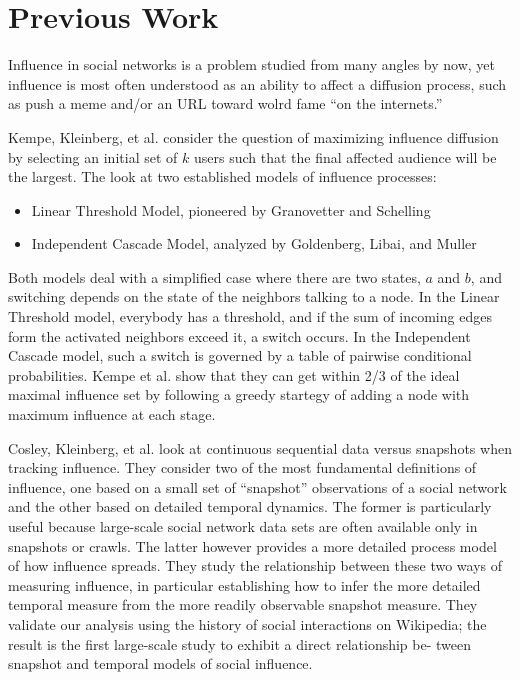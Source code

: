 \documentclass[10pt,oneside]{memoir}
\begin{document}
\pagebreak \chapter{Previous Work}
\label{previouswork}

Influence in social networks is a problem studied from many angles by now, yet influence is most often understood as an ability to affect a diffusion process, such as  push a meme and/or an URL toward wolrd fame ``on the internets.''


Kempe, Kleinberg, et al. \cite{Kempe:2005:Nodes} consider the question of maximizing influence diffusion by selecting an initial set of $k$ users such that the final affected audience will be the largest.  The look at two established models of influence processes:


\begin{itemize}


\item Linear Threshold Model, pioneered by Granovetter and Schelling

\item Independent Cascade Model, analyzed by Goldenberg, Libai, and Muller
\end{itemize}

Both models deal with a simplified case where there are two states, $a$ and $b$, and switching depends on the state of the neighbors talking to a node.  In the Linear Threshold model, everybody has a threshold, and if the sum of incoming edges form the activated neighbors exceed it, a switch occurs.  In the Independent Cascade model, such a switch is governed by a table of pairwise conditional probabilities.  Kempe et al. show that they can get within 2/3 of the ideal maximal influence set by following a greedy startegy of adding a node with maximum influence at each stage. 


Cosley, Kleinberg, et al. look at continuous sequential data versus snapshots when tracking influence.   They consider two of the most fundamental definitions of influence, one based on a small set of ``snapshot'' observations of a social network and the other based on detailed temporal dynamics. The former is particularly useful because large-scale social network data sets are often available only in snapshots or crawls. The latter however provides a more detailed process model of how influence spreads. They study the relationship between these two ways of measuring influence, in particular establishing how to infer the more detailed temporal measure from the more readily observable snapshot measure. They validate our analysis using the history of social interactions on Wikipedia; the result is the first large-scale study to exhibit a direct relationship be- tween snapshot and temporal models of social influence.
\end{document}
